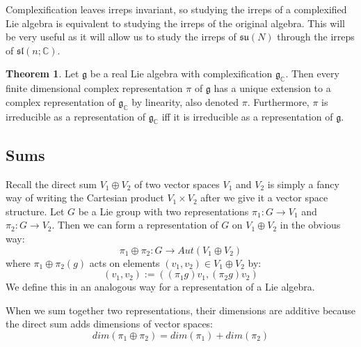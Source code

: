 \documentclass[11pt, oneside]{article}   	%
\theoremstyle{definition}
\newtheorem{theorem}{Theorem}[section]
\begin{document}
Complexification leaves irreps invariant, so studying the irreps of a complexified Lie algebra is equivalent to studying the irreps of 
the original algebra. This will be very useful as it will allow us to study the irreps of $\mathfrak{su}(N)$ through the irreps of 
$\mathfrak{sl}(n; \mathbb C)$. 

\begin{theorem}
	Let $\mathfrak g$ be a real Lie algebra with complexification $\mathfrak g_\mathbb{C}$. Then every finite dimensional 
	complex representation $\pi$ of $\mathfrak g$ has a unique extension to a complex representation of 
	$\mathfrak g_{\mathbb C}$ by linearity, also denoted $\pi$. Furthermore, $\pi$ is irreducible as a representation of 
	$\mathfrak g_{\mathbb C}$ iff it is irreducible as a representation of $\mathfrak g$. 
\end{theorem}

\subsection{Sums}

Recall the direct sum $V_1\oplus V_2$ of two vector spaces $V_1$ and $V_2$ is simply a fancy way of writing 
the Cartesian product $V_1\times V_2$ after we give it a vector space structure. 
Let $G$ be a Lie group with two representations $\pi_1 : G\rightarrow V_1$ and $\pi_2 : G\rightarrow V_2$. 
Then we can form a representation of $G$ on $V_1\oplus V_2$ in the obvious way:
\begin{equation}
	\pi_1\oplus\pi_2 : G\rightarrow Aut(V_1\oplus V_2)
\end{equation}
where $\pi_1\oplus\pi_2(g)$ acts on elements $(v_1, v_2)\in V_1\oplus V_2$ by:
\begin{equation}
	[(\pi_1\oplus \pi_2)g] (v_1, v_2) := ((\pi_1g)v_1, (\pi_2g)v_2)
\end{equation}
We define this in an analogous way for a representation of a Lie algebra. 

When we sum together two representations, their dimensions are additive because the direct sum adds 
dimensions of vector spaces:
\begin{equation}
	dim(\pi_1\oplus\pi_2) = dim(\pi_1) + dim(\pi_2)
\end{equation}
\end{document}
